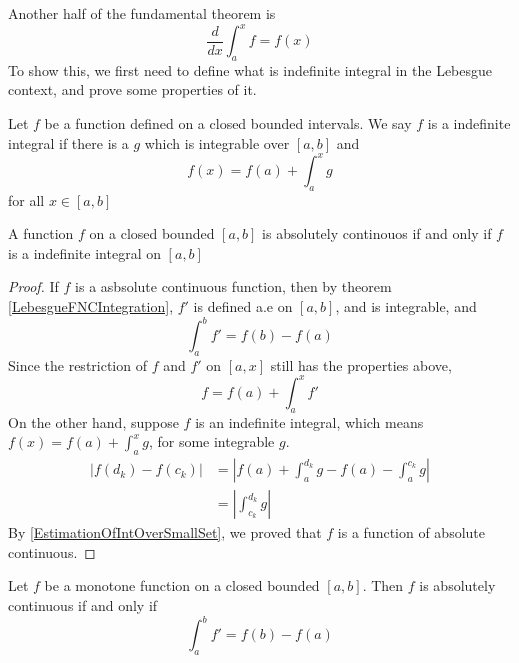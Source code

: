 \documentclass[lang=en, 12pt]{elegantbook}
\begin{document}
            Another half of the fundamental theorem is 
        $$\frac{d }{d x} \int_a^x f = f(x)$$
            To show this, we first need to define what is indefinite 
        integral in the Lebesgue context, and prove some properties of it.
            \begin{definition}
                Let $f$ be a function defined on a closed bounded intervals.
            We say $f$ is a indefinite integral if there is a 
            $g$ which is integrable over $[a,b]$ and 
            $$f(x) = f(a) + \int_a^x g$$
            for all $x \in [a,b]$
            \end{definition}
            \begin{theorem}\label{AbsoluteContinuousAndIndefiniteIntegral}
                A function $f$ on a closed bounded $[a,b]$ is absolutely
            continouos if and only if $f$ is a indefinite integral on $[a,b]$
            \end{theorem}
            \begin{proof}
                If $f$ is a asbsolute continuous function, then by theorem
            \ref{LebesgueFNCIntegration}, $f'$ is defined a.e on $[a,b]$,
            and is integrable, and 
            $$\int_a^b f' = f(b) - f(a)$$
                Since the restriction of $f$ and $f'$ on $[a,x]$
            still has the properties above,
            $$f = f(a) +\int_a^x f'$$
                On the other hand, suppose $f$ is an indefinite integral,
            which means $f(x) = f(a) + \int_a^x g$, for some integrable
            $g$.
                \begin{equation*}
                    \begin{aligned}
                        |f(d_k) - f(c_k)| &= |f(a) + \int_a^{d_k}g -f(a) - \int_a^{c_k} g|\\
                        &=| \int_{c_k}^{d_k} g|
                    \end{aligned}
                \end{equation*}
                By \ref{EstimationOfIntOverSmallSet}, we proved
            that $f$ is a function of absolute continuous.
            \end{proof}
            \begin{corollary}
                Let $f$ be a monotone function on a closed bounded $[a,b]$.
            Then $f$ is absolutely continuous if and only if 
            $$\int_a^b f' = f(b) -f(a)$$
            \end{corollary}
\end{document}
